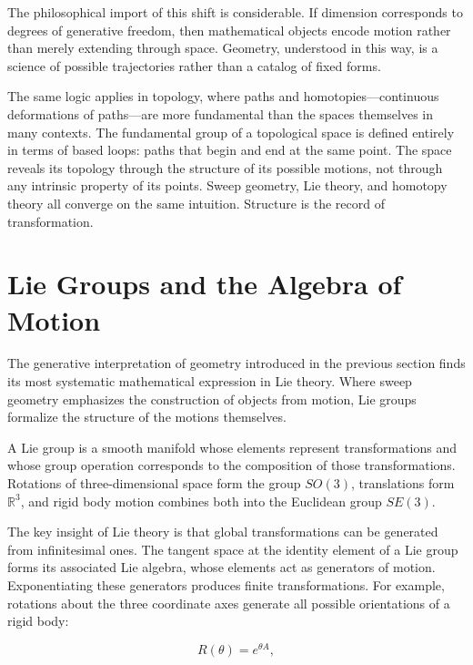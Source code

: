 \documentclass[11pt, a4paper]{article}
\theoremstyle{plain}
\theoremstyle{definition}
\theoremstyle{remark}
\begin{document}
The philosophical import of this shift is considerable. If dimension corresponds to
degrees of generative freedom, then mathematical objects encode motion rather than
merely extending through space. Geometry, understood in this way, is a science of
possible trajectories rather than a catalog of fixed forms.

The same logic applies in topology, where paths and homotopies---continuous deformations
of paths---are more fundamental than the spaces themselves in many contexts.
The fundamental group of a topological space is defined entirely in terms of based loops:
paths that begin and end at the same point. The space reveals its topology through the
structure of its possible motions, not through any intrinsic property of its points.
Sweep geometry, Lie theory, and homotopy theory all converge on the same intuition.
Structure is the record of transformation.


\section{Lie Groups and the Algebra of Motion}

The generative interpretation of geometry introduced in the previous section finds its
most systematic mathematical expression in Lie theory. Where sweep geometry emphasizes
the construction of objects from motion, Lie groups formalize the structure of the
motions themselves.

A Lie group is a smooth manifold whose elements represent transformations and whose
group operation corresponds to the composition of those transformations. Rotations of
three-dimensional space form the group $SO(3)$, translations form $\mathbb{R}^3$,
and rigid body motion combines both into the Euclidean group $SE(3)$.

The key insight of Lie theory is that global transformations can be generated from
infinitesimal ones. The tangent space at the identity element of a Lie group forms its
associated Lie algebra, whose elements act as generators of motion. Exponentiating
these generators produces finite transformations. For example, rotations about the
three coordinate axes generate all possible orientations of a rigid body:

\begin{equation}
R(\theta) = e^{\theta A},
\end{equation}
\end{document}
